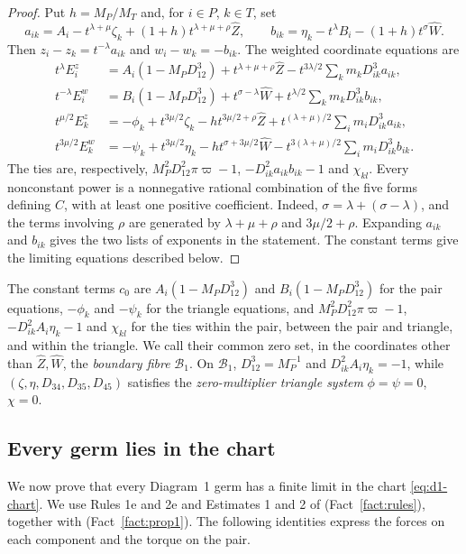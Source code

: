 \documentclass[11pt]{amsart}
\theoremstyle{definition}
\theoremstyle{remark}
\begin{document}
{\begin{proof}
Put $h=M_P/M_T$ and, for $i\in P$, $k\in T$, set
\[
 a_{ik}=A_i-t^{\lambda+\mu}\zeta_k
             +(1+h)t^{\lambda+\mu+\rho}\hat Z,\qquad
 b_{ik}=\eta_k-t^\lambda B_i-(1+h)t^\sigma\hat W.
\]
Then $z_i-z_k=t^{-\lambda}a_{ik}$ and $w_i-w_k=-b_{ik}$.
The weighted coordinate equations are
\begin{align*}
 t^\lambda E^z_i
 &=A_i(1-M_PD_{12}^3)+t^{\lambda+\mu+\rho}\hat Z
       -t^{3\lambda/2}\sum_km_kD_{ik}^3a_{ik},\\
 t^{-\lambda}E^w_i
 &=B_i(1-M_PD_{12}^3)+t^{\sigma-\lambda}\hat W
       +t^{\lambda/2}\sum_km_kD_{ik}^3b_{ik},\\
 t^{\mu/2}E^z_k
 &=-\phi_k+t^{3\mu/2}\zeta_k-h t^{3\mu/2+\rho}\hat Z
       +t^{(\lambda+\mu)/2}\sum_im_iD_{ik}^3a_{ik},\\
 t^{3\mu/2}E^w_k
 &=-\psi_k+t^{3\mu/2}\eta_k-h t^{\sigma+3\mu/2}\hat W
       -t^{3(\lambda+\mu)/2}\sum_im_iD_{ik}^3b_{ik}.
\end{align*}
The ties are, respectively,
$M_P^2D_{12}^2\pi\varpi-1$, $-D_{ik}^2a_{ik}b_{ik}-1$ and $\chi_{kl}$.
Every nonconstant power is a nonnegative rational combination of the five forms
defining $C$, with at least one positive coefficient.  Indeed,
$\sigma=\lambda+(\sigma-\lambda)$, and the terms involving $\rho$ are generated by
$\lambda+\mu+\rho$ and $3\mu/2+\rho$.  Expanding $a_{ik}$ and $b_{ik}$ gives the two
lists of exponents in the statement.  The constant terms give the limiting equations
described below.
\end{proof}

}{The constant terms $c_0$ are $A_i(1-M_PD_{12}^3)$ and
$B_i(1-M_PD_{12}^3)$ for the pair equations, $-\phi_k$ and $-\psi_k$ for the triangle
equations, and $M_P^2D_{12}^2\pi\varpi-1$, $-D_{ik}^2A_i\eta_k-1$ and $\chi_{kl}$ for the
ties within the pair, between the pair and triangle, and within the triangle.
We call their common zero set, in the coordinates other than $\hat Z,\hat W$, the
\emph{boundary fibre} $\mathcal B_1$.  On $\mathcal B_1$,
$D_{12}^3=M_P^{-1}$ and $D_{ik}^2A_i\eta_k=-1$, while
$(\zeta,\eta,D_{34},D_{35},D_{45})$ satisfies the \emph{zero-multiplier triangle system}
$\phi=\psi=0$, $\chi=0$.}

\subsection{Every germ lies in the chart}
{We now prove that every Diagram~1 germ has a finite limit in the chart
\eqref{eq:d1-chart}.  We use Rules 1e and 2e and Estimates 1 and 2 of \cite[\S3]{AK}
(Fact~\ref{fact:rules}), together with \cite[Prop.~1]{AK} (Fact~\ref{fact:prop1}).
The following identities express the forces on each component and the torque on the pair.}
\end{document}
